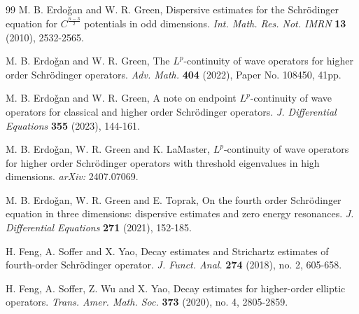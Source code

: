 \documentclass[11pt,reqno]{amsart}
\numberwithin{equation}{section}
\theoremstyle{definition}
\begin{document}
\begin{thebibliography}{99}
  M. B. Erdo\v{g}an and W. R. Green, Dispersive estimates for the Schr\"{o}dinger equation for $C^{\frac{n-3}{2}}$ potentials in odd dimensions. \textit{Int. Math. Res. Not. IMRN} \textbf{13} (2010), 2532-2565.

 M. B. Erdo\v{g}an and W. R. Green, The $L^p$-continuity of wave operators for higher order Schr\"{o}dinger operators.  \textit{Adv. Math.} \textbf{404} (2022), Paper No. 108450, 41pp.

 M. B. Erdo\v{g}an and W. R. Green, A note on endpoint $L^p$-continuity of wave operators for classical and higher order Schr\"{o}dinger operators. \textit{J. Differential Equations} \textbf{355} (2023), 144-161.

  M. B. Erdo\v{g}an, W. R. Green and  K. LaMaster, $L^p$-continuity of wave operators for higher order Schr\"{o}dinger operators with threshold eigenvalues in high dimensions. 	\emph{arXiv:} 2407.07069.

  M. B. Erdo\v{g}an, W. R. Green and  E. Toprak, On the fourth order Schr\"{o}dinger equation in three dimensions: dispersive estimates and zero energy resonances. \textit{J. Differential Equations} \textbf{271} (2021),  152-185.














 H. Feng, A. Soffer and X. Yao, Decay estimates and Strichartz estimates of fourth-order Schr\"{o}dinger operator. \textit{J. Funct. Anal.} \textbf{274} (2018), no. 2,  605-658.

 H. Feng, A. Soffer, Z. Wu and X. Yao, Decay estimates for higher-order elliptic operators. \textit{Trans. Amer. Math. Soc.} \textbf{373} (2020), no. 4, 2805-2859.


%


\end{thebibliography}
\end{document}
